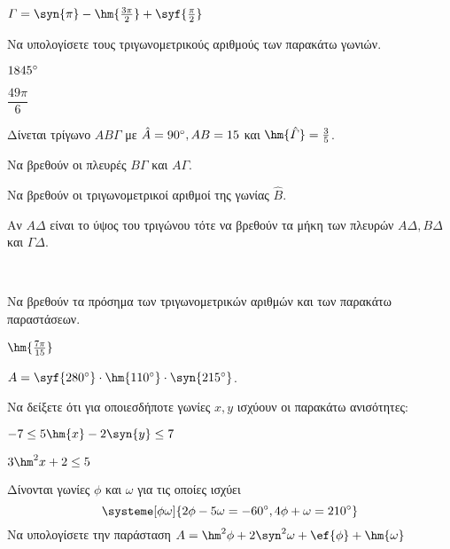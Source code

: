 \documentclass[twoside,nofonts,ektypwsh]{frontisthrio-diag}
\begin{document}
\begin{thema}
\begin{erwthma}
\begin{alist}
\item $ \varGamma=\syn{\pi}-\hm{\frac{3\pi}{2}}+\syf{\frac{\pi}{2}} $
\end{alist}
\item Να υπολογίσετε τους τριγωνομετρικούς αριθμούς των παρακάτω γωνιών.
\begin{multicols}{2}
\begin{alist}
\item $ 1845\degree $
\item $ \dfrac{49\pi}{6} $
\end{alist}
\end{multicols}
\end{erwthma}
\item Δίνεται τρίγωνο $ AB\varGamma $ με $ \hat{A}=90\degree, AB=15 $ και $ \hm{\hat{\varGamma}}=\frac{3}{5} $.
\begin{erwthma}
\item Να βρεθούν οι πλευρές $ B\varGamma $ και $ A\varGamma $.
\item Να βρεθούν οι τριγωνομετρικοί αριθμοί της γωνίας $ \hat{B} $.
\item Αν $ A\varDelta $ είναι το ύψος του τριγώνου τότε να βρεθούν τα μήκη των πλευρών $ A\varDelta,B\varDelta $ και $ \varGamma\varDelta $.
\end{erwthma}
\item\mbox{}\\\vspace{-7mm}
\begin{erwthma}
\item Να βρεθούν τα πρόσημα των τριγωνομετρικών αριθμών και των παρακάτω παραστάσεων.
\begin{alist}
\item $ \hm{\frac{7\pi}{15}} $
\item $ A=\syf{280\degree}\cdot\hm{110\degree}\cdot\syn{215\degree} $.
\end{alist}
\item Να δείξετε ότι για οποιεσδήποτε γωνίες $ x,y $ ισχύουν οι παρακάτω ανισότητες:
\begin{alist}
\item $ -7\leq 5\hm{x}-2\syn{y}\leq 7 $
\item $ 3\hm^2{x}+2\leq 5 $
\end{alist}
\item Δίνονται γωνίες $ \phi $ και $ \omega $ για τις οποίες ισχύει
\[ \systeme[\phi\omega]{2\phi-5\omega=-60\degree,4\phi+\omega=210\degree} \]
Να υπολογίσετε την παράσταση $ A=\hm^2{\phi}+2\syn^2{\omega}+\ef{\phi}+\hm{\omega} $
\end{erwthma}
\end{thema}
\end{document}
